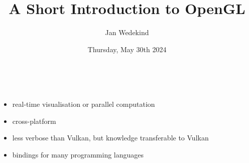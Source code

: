 \documentclass[calcdimensions,landscape,letterpaper]{powersem}
\title{A Short Introduction to OpenGL}
\author{Jan Wedekind}
\date{Thursday, May 30th 2024}
\newcommand{\thecurrentheading}{}
\newcommand{\heading}[1]{\renewcommand{\thecurrentheading}{#1}}
\begin{document}
\begin{slide}
  \heading{\ }
  \begin{center}
    \maketitle
  \end{center}
\end{slide}

\begin{slide}
  \heading{Motivation}
  \begin{center}
    \bigskip\\
    \begin{minipage}[c]{\textwidth}
      \begin{itemize}
        \item real-time visualisation or parallel computation
        \item cross-platform
        \item less verbose than Vulkan, but knowledge transferable to Vulkan
        \item bindings for many programming languages
      \end{itemize}
    \end{minipage}
  \end{center}
\end{slide}
\end{document}
